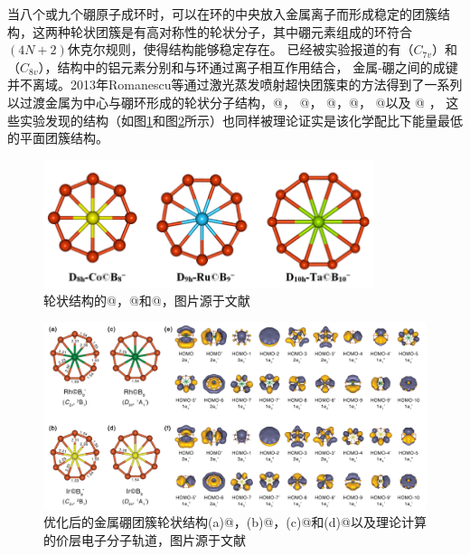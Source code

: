 当八个或九个硼原子成环时，可以在环的中央放入金属离子而形成稳定的团簇结构，这两种轮状团簇是有高对称性的轮状分子，其中硼元素组成的环符合$(4N+2)$休克尔规则，使得结构能够稳定存在\cite{zhai2003hepta,alexandrova2004molecular}。
已经被实验报道的有（$C_{7v}$）和（$C_{8v}$）\cite{galeev2011valence}，结构中的铝元素分别和与环通过离子相互作用结合，
金属-硼之间的成键并不离域。2013年Romanescu等通过激光蒸发喷射超快团簇束的方法得到了一系列以过渡金属为中心与硼环形成的轮状分子结构，@， @， @，@， @以及 @ \cite{romanescu2011aromatic,galeev2011valence,li2012transition}，
这些实验发现的结构（如图\ref{fig:ch1_boron_wheel01}和图\ref{fig:ch1_boron_wheel02}所示）也同样被理论证实是该化学配比下能量最低的平面团簇结构。

\begin{figure}[bt]
  \includegraphics[width=0.86\textwidth]{figs/ch1_boron_wheel01.png}
  \centering
  \caption{轮状结构的@，@和@，图片源于文献\cite{romanescu2013transition}}
  \label{fig:ch1_boron_wheel01}
\end{figure}

\begin{figure}
  \includegraphics[width=1.0\textwidth]{figs/ch1_boron_wheel02.png}
  \centering
  \caption{优化后的金属硼团簇轮状结构(a)@，(b)@，(c)@和(d)@以及理论计算的价层电子分子轨道，图片源于文献\cite{li2012transition}}
  \label{fig:ch1_boron_wheel02}
\end{figure}

